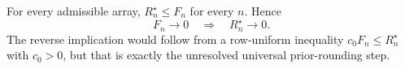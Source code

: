 For every admissible array, \(R_n^{\star}\le F_n\) for every \(n\).  Hence
\[
 F_n\longrightarrow0\quad\Longrightarrow\quad R_n^{\star}\longrightarrow0.
\]
The reverse implication would follow from a row-uniform inequality \(c_0F_n\le R_n^{\star}\) with \(c_0>0\), but that is exactly the unresolved universal prior-rounding step.